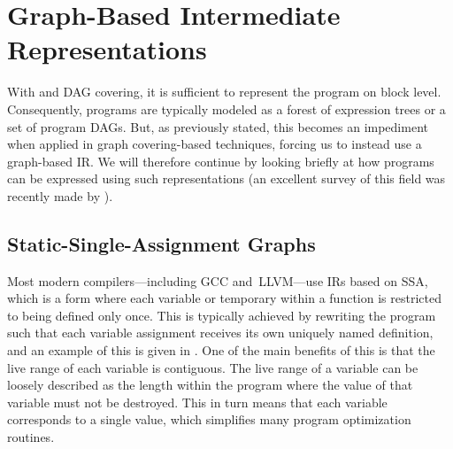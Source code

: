 \section{Graph-Based Intermediate Representations}

With  and \gls{DAG covering}, it is sufficient to
represent the \gls{program} on \gls{block} level.
%
Consequently, \glspl{program}
are typically modeled as a \gls{forest} of \glspl{expression tree} or a set of
\glspl{program DAG}.
%
But, as previously stated, this becomes an impediment when
applied in \gls{graph covering}-based techniques, forcing us to instead use a
\gls{graph}-based \glsdesc{IR}.
%
We will therefore continue by looking briefly at
how \glspl{program} can be expressed using such representations (an excellent
survey of this field was recently made by \textcite{Stanier2013}).


\subsection{Static-Single-Assignment Graphs}

Most modern \glspl{compiler}---including \gls{GCC} and~\gls{LLVM}---use
\glspl{IR} based on \gls{SSA}, which is a form where each variable or
\gls{temporary} within a \gls{function} is restricted to being defined only
once.
%
This is typically achieved by rewriting the \gls{program} such that each
variable assignment receives its own uniquely named definition, and an example
of this is given in .
%
One of the main benefits of this is
that the \gls{live range} of each variable is contiguous.
%
The \gls{live range}
of a variable can be loosely described as the length within the \gls{program}
where the value of that variable must not be destroyed.
%
This in turn means that each variable corresponds to a single value, which
simplifies many \gls{program} optimization routines.

